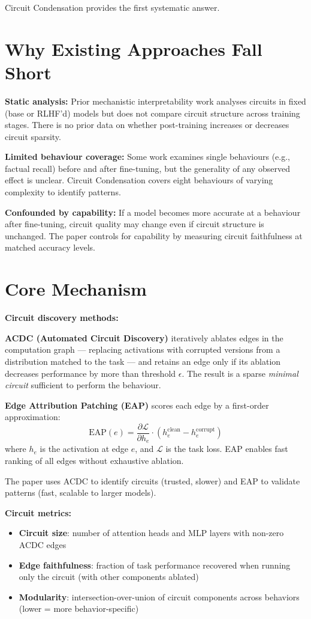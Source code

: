 \documentclass[10pt,twocolumn]{article}
\begin{document}
Circuit Condensation provides the first systematic answer.

\section{Why Existing Approaches Fall Short}

\textbf{Static analysis:} Prior mechanistic interpretability work
analyses circuits in fixed (base or RLHF'd) models but does not
compare circuit structure across training stages. There is no prior
data on whether post-training increases or decreases circuit sparsity.

\textbf{Limited behaviour coverage:} Some work examines single
behaviours (e.g., factual recall) before and after fine-tuning,
but the generality of any observed effect is unclear. Circuit
Condensation covers eight behaviours of varying complexity to
identify patterns.

\textbf{Confounded by capability:} If a model becomes more accurate
at a behaviour after fine-tuning, circuit quality may change even if
circuit structure is unchanged. The paper controls for capability
by measuring circuit faithfulness at matched accuracy levels.

\section{Core Mechanism}

\textbf{Circuit discovery methods:}

\textbf{ACDC (Automated Circuit Discovery)} iteratively ablates
edges in the computation graph — replacing activations with
corrupted versions from a distribution matched to the task —
and retains an edge only if its ablation decreases performance
by more than threshold $\epsilon$. The result is a sparse
\emph{minimal circuit} sufficient to perform the behaviour.

\textbf{Edge Attribution Patching (EAP)} scores each edge by
a first-order approximation:
\[
  \text{EAP}(e) = \frac{\partial \mathcal{L}}{\partial h_e}
    \cdot (h_e^\text{clean} - h_e^\text{corrupt})
\]
where $h_e$ is the activation at edge $e$, and $\mathcal{L}$ is
the task loss. EAP enables fast ranking of all edges without
exhaustive ablation.

The paper uses ACDC to identify circuits (trusted, slower) and
EAP to validate patterns (fast, scalable to larger models).

\textbf{Circuit metrics:}
\begin{itemize}[itemsep=2pt,parsep=0pt]
  \item \textbf{Circuit size}: number of attention heads and MLP
    layers with non-zero ACDC edges
  \item \textbf{Edge faithfulness}: fraction of task performance
    recovered when running only the circuit (with other components
    ablated)
  \item \textbf{Modularity}: intersection-over-union of circuit
    components across behaviors (lower = more behavior-specific)
\end{itemize}
\end{document}
